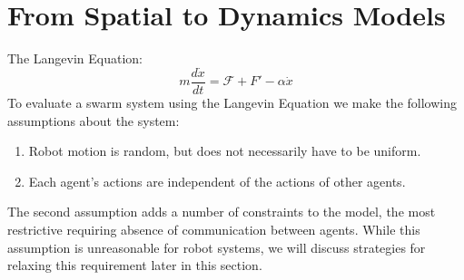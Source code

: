 \documentclass[Main.tex]{subfiles}
\begin{document}
\section{From Spatial to Dynamics Models}
The Langevin Equation:
\begin{equation}
	m \frac{d\dot{x}}{dt} = \mathcal{F} + F' - \alpha\dot{x}
\end{equation}
To evaluate a swarm system using the Langevin Equation we make the following assumptions about the system:
\begin{enumerate}[1.]
\item Robot motion is random, but does not necessarily have to be uniform.
\item Each agent's actions are independent of the actions of other agents.
\end{enumerate}
The second assumption adds a number of constraints to the model, the most restrictive requiring absence of communication between agents. While this assumption is unreasonable for robot systems, we will discuss strategies for relaxing this requirement later in this section\cite{Reif1965}.
\end{document}
